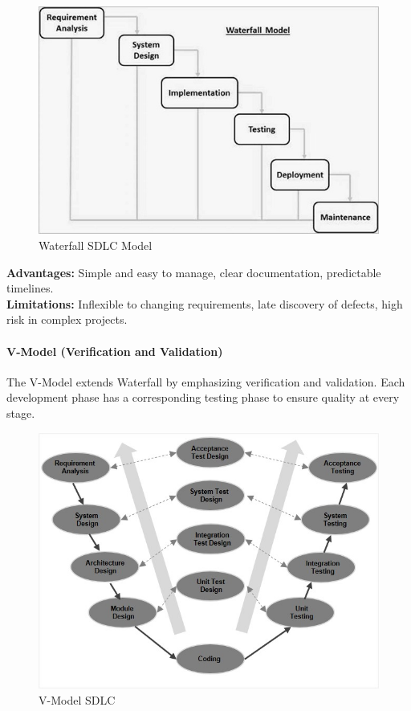 \begin{spacing}{1.2}
\begin{figure}[H]
    \centering
    \includegraphics[scale=0.6]{Images/sdlc_waterfall_model.jpg}
    \caption{Waterfall SDLC Model}
    \label{fig:waterfall_model}
\end{figure}

\textbf{Advantages:} Simple and easy to manage, clear documentation, predictable timelines.\\ 
\textbf{Limitations:} Inflexible to changing requirements, late discovery of defects, high risk in complex projects.  

\paragraph{V-Model (Verification and Validation)}
The V-Model extends Waterfall by emphasizing verification and validation. Each development phase has a corresponding testing phase to ensure quality at every stage.  

\begin{figure}[H]
    \centering
    \includegraphics[scale=0.8]{Images/sdlc_v_model.jpg}
    \caption{V-Model SDLC}
    \label{fig:v_model}
\end{figure}


\end{spacing}
